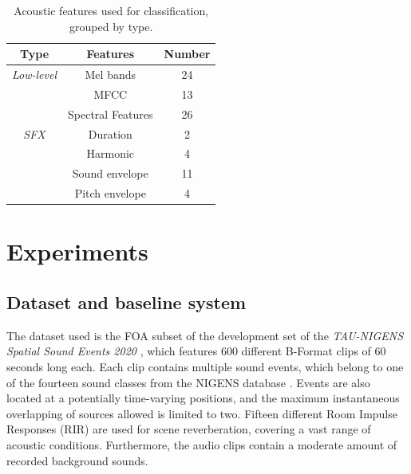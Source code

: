 \begin{table}[t!]
\caption{Acoustic features used for classification, grouped by type.}
\begin{footnotesize}
\begin{center}
\begin{tabular}{ccc}
\toprule
Type & Features & Number \\
\midrule
\textit{Low-level} & Mel bands & 24       \\
& MFCC & 13 \\
& Spectral Features & 26 \\
\midrule
\textit{SFX }& Duration &2 \\
& Harmonic & 4 \\
& Sound envelope & 11\\
& Pitch envelope & 4\\
\bottomrule
\end{tabular}
\end{center}
\end{footnotesize}
\label{tab:features}
\end{table}




\section{Experiments}
\label{sec:experiments}


\subsection{Dataset and baseline system}

The dataset used is the FOA subset of the development set of the \textit{TAU-NIGENS Spatial Sound Events 2020} \cite{politis2020dataset}, which features 600 different B-Format clips of 60 seconds long each. 
Each clip contains multiple sound events, which belong to one of the fourteen sound classes from the NIGENS database \cite{trowitzsch2019nigens}.
Events are also located at a potentially time-varying positions, and the maximum instantaneous overlapping of sources allowed is limited to two. Fifteen different Room Impulse Responses (RIR) are used for scene reverberation, covering a vast range of acoustic conditions. Furthermore, the audio clips contain a moderate amount of recorded background sounds. 


